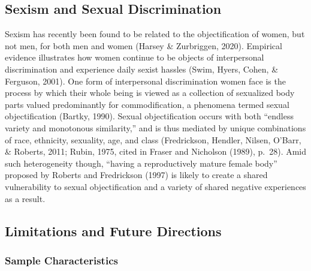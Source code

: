 \documentclass[man]{apa6}
\begin{document}
\subsection{Sexism and Sexual
Discrimination}\label{sexism-and-sexual-discrimination}

Sexism has recently been found to be related to the objectification of
women, but not men, for both men and women (Harsey \& Zurbriggen, 2020).
Empirical evidence illustrates how women continue to be objects of
interpersonal discrimination and experience daily sexist hassles (Swim,
Hyers, Cohen, \& Ferguson, 2001). One form of interpersonal
discrimination women face is the process by which their whole being is
viewed as a collection of sexualized body parts valued predominantly for
commodification, a phenomena termed sexual objectification (Bartky,
1990). Sexual objectification occurs with both \enquote{endless variety
and monotonous similarity,} and is thus mediated by unique combinations
of race, ethnicity, sexuality, age, and class (Fredrickson, Hendler,
Nilsen, O'Barr, \& Roberts, 2011; Rubin, 1975, cited in Fraser and
Nicholson (1989), p.~28). Amid such heterogeneity though,
\enquote{having a reproductively mature female body} proposed by Roberts
and Fredrickson (1997) is likely to create a shared vulnerability to
sexual objectification and a variety of shared negative experiences as a
result.

\subsection{Limitations and Future
Directions}\label{limitations-and-future-directions}

\subsubsection{Sample Characteristics}\label{sample-characteristics}
\end{document}

